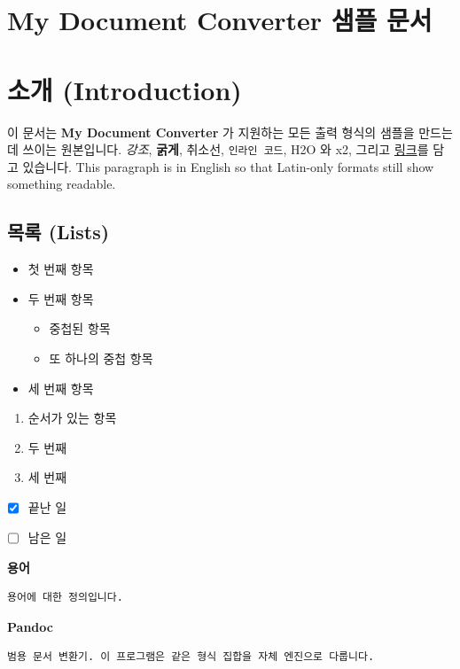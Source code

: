 \documentclass[11pt]{article}
\date{}
\begin{document}
\section*{My Document Converter 샘플 문서}\label{my-document-converter-샘플-문서}

\section*{소개 (Introduction)}\label{소개-introduction}

이 문서는 \textbf{My Document Converter} 가 지원하는 모든 출력 형식의 샘플을 만드는 데 쓰이는
원본입니다.
\emph{강조}, \textbf{굵게}, 취소선, \verb|인라인 코드|, H2O 와 x2, 그리고
\href{https://example.com}{링크}를 담고 있습니다. This paragraph is in
English so that Latin-only formats still show something readable.

\subsection*{목록 (Lists)}\label{목록-lists}

\begin{itemize}
\item 첫 번째 항목
\item 두 번째 항목
\begin{itemize}
\item 중첩된 항목
\item 또 하나의 중첩 항목
\end{itemize}
\item 세 번째 항목
\end{itemize}

\begin{enumerate}
\item 순서가 있는 항목
\item 두 번째
\item 세 번째
\end{enumerate}

\begin{itemize}
\item ☒ 끝난 일
\item ☐ 남은 일
\end{itemize}

\textbf{용어}

\begin{verbatim}
용어에 대한 정의입니다.
\end{verbatim}

\textbf{Pandoc}

\begin{verbatim}
범용 문서 변환기. 이 프로그램은 같은 형식 집합을 자체 엔진으로 다룹니다.
\end{verbatim}
\end{document}
